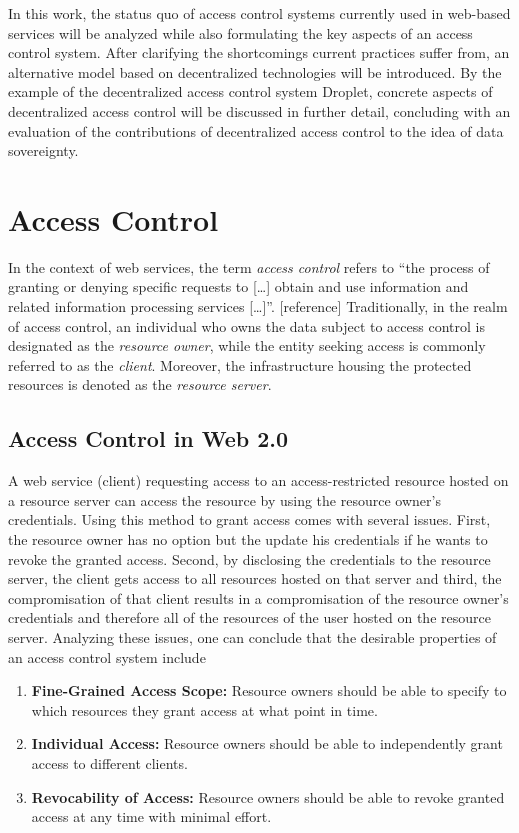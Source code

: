 \documentclass[conference]{IEEEtran}
\begin{document}
In this work, the status quo of access control systems currently used in web-based services will be analyzed while also formulating the key aspects of an access control system.
After clarifying the shortcomings current practices suffer from, an alternative model based on decentralized technologies will be introduced.
By the example of the decentralized access control system Droplet, concrete aspects of decentralized access control will be discussed in further detail, concluding with an evaluation of the contributions of decentralized access control to the idea of data sovereignty.

\section{Access Control}
In the context of web services, the term \textit{access control} refers to \enquote{the process of granting or denying specific requests to [\dots] obtain and use information and related information processing services [\dots]}. [reference] %
Traditionally, in the realm of access control, an individual who owns the data subject to access control is designated as the \textit{resource owner}, while the entity seeking access is commonly referred to as the \textit{client}.
Moreover, the infrastructure housing the protected resources is denoted as the \textit{resource server}.

\subsection{Access Control in Web 2.0}
A web service (client) requesting access to an access-restricted resource hosted on a resource server can access the resource by using the resource owner's credentials.
Using this method to grant access comes with several issues.
First, the resource owner has no option but the update his credentials if he wants to revoke the granted access.
Second, by disclosing the credentials to the resource server, the client gets access to all resources hosted on that server and third, the compromisation of that client results in a compromisation of the resource owner's credentials and therefore all of the resources of the user hosted on the resource server.
Analyzing these issues, one can conclude that the desirable properties of an access control system include

\begin{enumerate}
  \item \textbf{Fine-Grained Access Scope:} Resource owners should be able to specify to which resources they grant access at what point in time.
  \item \textbf{Individual Access:} Resource owners should be able to independently grant access to different clients.
  \item \textbf{Revocability of Access:} Resource owners should be able to revoke granted access at any time with minimal effort.
\end{enumerate}
\end{document}
